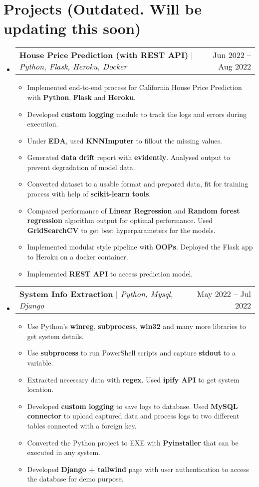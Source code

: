 \documentclass[letterpaper,11pt]{article}
\makeatletter
\newcommand{\resumeItem}[1]{
  \item\small{
    {#1 \vspace{-2pt}}
  }
}
\newcommand{\resumeProjectHeading}[2]{
    \item
    \begin{tabular*}{0.97\textwidth}{l@{\extracolsep{\fill}}r}
      \small#1 & #2 \\
    \end{tabular*}\vspace{-7pt}
}
\newcommand{\resumeSubHeadingListStart}{\begin{itemize}[leftmargin=0.15in, label={}]}
\newcommand{\resumeSubHeadingListEnd}{\end{itemize}}
\newcommand{\resumeItemListStart}{\begin{itemize}}
\newcommand{\resumeItemListEnd}{\end{itemize}\vspace{-5pt}}
\makeatother
\begin{document}
\section{Projects \small{(Outdated. Will be updating this soon)}}
\resumeSubHeadingListStart 
\resumeProjectHeading
{\textbf{House Price Prediction (with REST API)} $|$ \emph{Python, Flask, Heroku, Docker}}{Jun 2022 -- Aug 2022}
\resumeItemListStart \resumeItem{Implemented end-to-end process for California House Price Prediction with {\textbf{Python}}, {\textbf{Flask}} and {\textbf{Heroku}}.}
\resumeItem{Developed {\textbf{custom logging}} module to track the logs and errors during execution.}
\resumeItem{Under {\textbf{EDA}}, used {\textbf{KNNImputer}} to fillout the missing values.}
\resumeItem{Generated {\textbf{data drift}} report with {\textbf{evidently}}. Analysed output to prevent degradation of model data.}
\resumeItem{Converted dataset to a usable format and prepared data, fit for training process with help of {\textbf{scikit-learn tools}}.}
\resumeItem{Compared performance of {\textbf{Linear Regression}} and {\textbf{Random forest regression}} algorithm output for optimal performance. Used {\textbf{GridSearchCV}} to get best hyperparameters for the models.}
\resumeItem{Implemented modular style pipeline with {\textbf{OOPs}}. Deployed the Flask app to Heroku on a docker container.}
\resumeItem{Implemented {\textbf{REST API}} to access prediction model.} 
\resumeItemListEnd

\vspace{0.6cm}
\resumeProjectHeading {\textbf{System Info Extraction} $|$ \emph{Python, Mysql, Django}}{May 2022 -- Jul 2022}
\resumeItemListStart
\resumeItem{Use Python's {\textbf{winreg}}, {\textbf{subprocess}}, {\textbf{win32}} and many more libraries to get system details.}
\resumeItem{Use {\textbf{subprocess}} to run PowerShell scripts and capture {\textbf{stdout}} to a variable.}
\resumeItem{Extracted necessary data with {\textbf{regex}}. Used {\textbf{ipify API}} to get system location.}
\resumeItem{Developed {\textbf{custom logging}} to save logs to database. Used {\textbf{MySQL connector}} to upload captured data and process logs to two different tables connected with a foreign key.}
\resumeItem{Converted the Python project to EXE with {\textbf{Pyinstaller}} that can be executed in any system.}
\resumeItem{Developed {\textbf{Django + tailwind}} page with user authentication to access the database for demo purpose.}
\resumeItemListEnd \resumeSubHeadingListEnd
\end{document}
